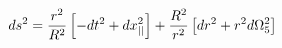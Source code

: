 \begin{equation}
ds^{2}=\frac{r^{2}}{R^{2}}\left[ -dt^{2}+dx_{||}^{2}\right] +\frac{R^{2}}{%
r^{2}}\left[ dr^{2}+r^{2}d\Omega _{5}^{2}\right]  \label{d5metric}
\end{equation}

